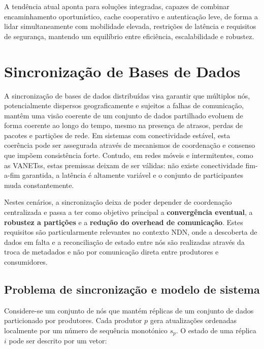 A tendência atual aponta para soluções integradas, capazes de combinar encaminhamento oportunístico, cache cooperativo e autenticação leve, de forma a lidar simultaneamente com mobilidade elevada, restrições de latência e requisitos de segurança, mantendo um equilíbrio entre eficiência, escalabilidade e robustez.

\section{Sincronização de Bases de Dados}
\label{sec:sync_distrib}

A sincronização de bases de dados distribuídas visa garantir que múltiplos nós, potencialmente dispersos geograficamente e sujeitos a falhas de comunicação, mantêm uma visão coerente de um conjunto de
dados partilhado evoluem de forma coerente ao longo do tempo, mesmo na presença de atrasos, perdas de pacotes e partições de rede. Em sistemas com conectividade estável, esta coerência pode ser assegurada através de mecanismos de coordenação e consenso que impõem consistência forte. Contudo, em redes móveis e intermitentes, como as \glspl{VANETs}, estas premissas deixam de ser válidas: não existe conectividade fim-a-fim garantida, a latência é altamente variável e o conjunto de participantes muda constantemente.

Nestes cenários, a sincronização deixa de poder depender de coordenação centralizada e passa a ter como objetivo principal a \textbf{convergência eventual}, a \textbf{robustez a partições} e a \textbf{redução do overhead de comunicação}. Estes requisitos são particularmente relevantes no contexto \gls{NDN}, onde a descoberta de dados em falta e a reconciliação de estado entre nós são realizadas através da troca de metadados e não por comunicação direta entre produtores e consumidores.

\subsection{Problema de sincronização e modelo de sistema}
\label{sub:sync_modelo_sistema}

Considere-se um conjunto de nós que mantém réplicas de um conjunto de dados particionado por produtores. Cada produtor $p$ gera atualizações ordenadas localmente por um número de sequência monotónico $s_p$. O estado de uma réplica $i$ pode ser descrito por um vetor:

